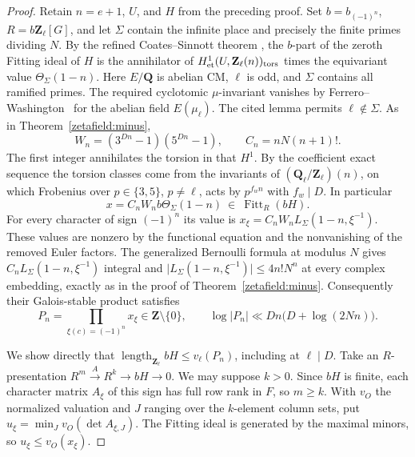 \begin{proof}
Retain \(n=e+1\), \(U\), and \(H\) from the preceding proof. Set
\(b=b_{(-1)^n}\), \(R=b\mathbf Z_\ell[G]\), and let \(\Sigma\) contain
the infinite place and precisely the finite primes dividing \(N\).
By the refined Coates--Sinnott theorem
\cite[Theorem~6.11 and Lemma~6.12]{greitherPopescuCS},
the \(b\)-part of the zeroth Fitting ideal of \(H\) is the
annihilator of \(H^1_{\rm et}(U,\mathbf Z_\ell(n))_{\rm tors}\)
times the equivariant value \(\Theta_\Sigma(1-n)\). Here \(E/\mathbf Q\)
is abelian CM, \(\ell\) is odd, and \(\Sigma\) contains all ramified
primes. The required cyclotomic \(\mu\)-invariant vanishes by
Ferrero--Washington~\cite{ferreroWashington} for the abelian field
\(E(\mu_\ell)\). The cited lemma permits \(\ell\notin\Sigma\).
As in Theorem~\ref{zetafield:minus},
\[
 W_n=(3^{Dn}-1)(5^{Dn}-1),\qquad C_n=nN(n+1)!.
\]
The first integer annihilates the torsion in that \(H^1\). By the
coefficient exact sequence the torsion classes come from the
invariants of \((\mathbf Q_\ell/\mathbf Z_\ell)(n)\),
on which Frobenius over \(p\in\{3,5\}\), \(p\ne\ell\), acts by
\(p^{f_wn}\) with \(f_w\mid D\). In particular
\[
 x=C_nW_n b\Theta_\Sigma(1-n)\ \in\ \operatorname{Fitt}_R(bH).
\]
For every character of sign \((-1)^n\) its value is
\(x_\xi=C_nW_n L_\Sigma(1-n,\xi^{-1})\). These values are nonzero
by the functional equation and the nonvanishing of the removed Euler
factors. The generalized Bernoulli formula at modulus \(N\) gives
\(C_n L_\Sigma(1-n,\xi^{-1})\) integral and
\(\lvert L_\Sigma(1-n,\xi^{-1})\rvert\le 4n!N^n\) at every complex
embedding, exactly as in the proof of Theorem~\ref{zetafield:minus}.
Consequently their Galois-stable product satisfies
\[
 P_n=\prod_{\xi(c)=(-1)^n} x_\xi\in\mathbf Z\setminus\{0\},
 \qquad \log|P_n|\ll Dn\bigl(D+\log(2Nn)\bigr).
\]

We show directly that \(\operatorname{length}_{\mathbf Z_\ell} bH
\le v_\ell(P_n)\), including at \(\ell\mid D\). Take an \(R\)-presentation
\(R^m\xrightarrow{A}R^k\to bH\to0\). We may suppose \(k>0\).
Since \(bH\) is finite, each character matrix \(A_\xi\) of this sign
has full row rank in \(F\), so \(m\ge k\). With \(v_O\) the normalized
valuation and \(J\) ranging over the \(k\)-element column sets, put
\(u_\xi=\min_J v_O(\det A_{\xi,J})\). The Fitting ideal is generated
by the maximal minors, so \(u_\xi\le v_O(x_\xi)\).


\end{proof}
